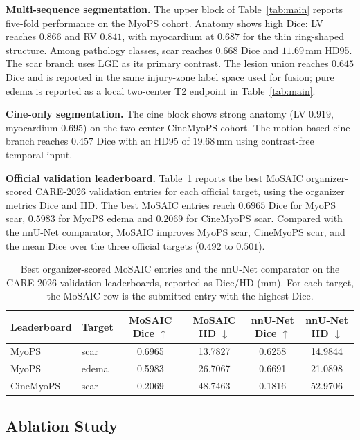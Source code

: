 \documentclass[runningheads]{llncs}
\begin{document}
\noindent\textbf{Multi-sequence segmentation.} The upper block of
Table~\ref{tab:main} reports five-fold performance on the MyoPS cohort.
Anatomy shows high Dice: LV reaches $0.866$ and RV $0.841$, with
myocardium at $0.687$ for the thin ring-shaped structure. Among pathology
classes, scar reaches $0.668$ Dice and $11.69$\,mm HD95. The scar branch uses
LGE as its primary contrast. The lesion union reaches $0.645$ Dice and is
reported in the same injury-zone label space used for fusion; pure edema is
reported as a local two-center T2 endpoint in
Table~\ref{tab:main}.

\noindent\textbf{Cine-only segmentation.} The cine block shows strong anatomy
(LV $0.919$, myocardium $0.695$) on the two-center CineMyoPS cohort. The
motion-based cine branch reaches $0.457$ Dice with an HD95 of $19.68$\,mm using
contrast-free temporal input.

\noindent\textbf{Official validation leaderboard.} Table~\ref{tab:leaderboard}
reports the best MoSAIC organizer-scored CARE-2026 validation entries for each
official target, using the organizer metrics Dice and HD. The best MoSAIC entries
reach $0.6965$ Dice for MyoPS scar, $0.5983$ for MyoPS edema and $0.2069$ for
CineMyoPS scar. Compared with the nnU-Net comparator, MoSAIC improves MyoPS scar,
CineMyoPS scar, and the mean Dice over the three official targets ($0.492$ to
$0.501$).

\begin{table}[t]
\centering
\caption{Best organizer-scored MoSAIC entries and the nnU-Net comparator on the
CARE-2026 validation leaderboards, reported as Dice/HD (mm). For each target, the
MoSAIC row is the submitted entry with the highest Dice.}
\label{tab:leaderboard}
\scriptsize
\begin{tabular}{llcccc}
\toprule
Leaderboard & Target & MoSAIC Dice $\uparrow$ & MoSAIC HD $\downarrow$ & nnU-Net Dice $\uparrow$ & nnU-Net HD $\downarrow$ \\
\midrule
MyoPS & scar & 0.6965 & 13.7827 & 0.6258 & 14.9844 \\
MyoPS & edema & 0.5983 & 26.7067 & 0.6691 & 21.0898 \\
CineMyoPS & scar & 0.2069 & 48.7463 & 0.1816 & 52.9706 \\
\bottomrule
\end{tabular}
\end{table}

\iffalse
\subsection{Ablation Study}
\end{document}
